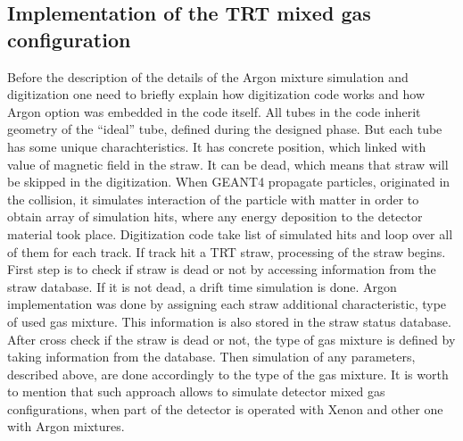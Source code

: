 \subsection{Implementation of the TRT mixed gas configuration}
Before the description of the details of the Argon mixture simulation and digitization one need to briefly explain how digitization code works and how Argon option was embedded in the code itself.
All tubes in the code inherit geometry of the ``ideal'' tube, defined during the designed phase. But each tube has some unique charachteristics. It has concrete position, 
which linked with value of magnetic field in the straw. It can be dead, which means that straw will be skipped in the digitization.
When GEANT4 propagate particles, originated in the collision, it simulates interaction of the particle with matter in order to obtain array of simulation hits, where any energy deposition to the 
detector material took place. Digitization code take list of simulated hits and loop over all of them for each track. If track hit a TRT straw, processing of the straw begins.
First step is to check if straw is dead or not by accessing information from the straw database.
If it is not dead, a drift time simulation is done.
Argon implementation was done by assigning each straw additional characteristic, type of used gas mixture. This information is also stored in the straw status database.
After cross check if the straw is dead or not, the type of gas mixture is defined by taking information from the database.
Then simulation of any parameters, described above, are done accordingly to the type of the gas mixture.
It is worth to mention that such approach allows to simulate detector mixed gas configurations, when part of the detector is operated with Xenon and other one with Argon mixtures.

